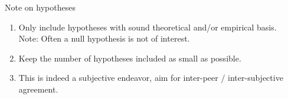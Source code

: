 \documentclass[10pt]{beamer}\usepackage[]{graphicx}\usepackage[]{xcolor}
\begin{document}
%
\begin{frame}{Note on hypotheses}
	\begin{enumerate}
		\item Only include hypotheses with sound theoretical and/or empirical basis.\\
		Note: Often a null hypothesis is not of interest.
		\item Keep the number of hypotheses included as small as possible.
		\item This is indeed a subjective endeavor, aim for inter-peer / inter-subjective agreement.
	\end{enumerate}
\end{frame}

%
\end{document}
